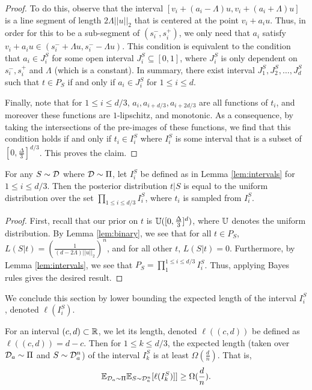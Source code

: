 \begin{proof}
To do this, observe that the interval $[v_i + (a_i - \Lambda)u, v_i + (a_i + \Lambda)u]$ is a line segment of length $2\Lambda||u||_2$ that is centered at the point $v_i + a_iu$. Thus, in order for this to be a sub-segment of $(s_i^-, s_i^+)$, we only need that $a_i$ satisfy $v_i + a_iu \in (s_i^- + \Lambda u, s_i^- - \Lambda u)$. This condition is equivalent to the condition that $a_i \in J_i^S$ for some open interval $J_i^S \subseteq [0, 1]$, where $J_i^S$ is only dependent on $s_i^-, s_i^+$ and $\Lambda$ (which is a constant). In summary, there exist interval $J_1^S, J_2^S, \dots, J_d^S$ such that $t \in P_S$ if and only if $a_i \in J_i^S$ for $1 \leq i \leq d$.

Finally, note that for $1 \leq i \leq d/3$, $a_i, a_{i+d/3}, a_{i + 2d/3}$ are all functions of $t_i$, and moreover these functions are $1$-lipschitz, and monotonic. As a consequence, by taking the intersections of the pre-images of these functions, we find that this condition holds if and only if $t_i \in I_i^S$ where $I_i^S$ is some interval that is a subset of $[0, \frac{\Delta}{3}]^{d/3}$. This proves the claim.
\end{proof}

\begin{cor}\label{cor:posterior}
For any $S \sim {\mathcal D}$ where ${\mathcal D} \sim \Pi$, let $I_i^S$ be defined as in Lemma \ref{lem:intervals} for $1 \leq i \leq d/3$. Then the posterior distribution $t|S$ is equal to the uniform distribution over the set $\prod_{1 \leq i \leq d/3} I_i^S$, where $t_i$ is sampled from $I_i^S$. 
\end{cor}

\begin{proof}
First, recall that our prior on $t$ is $\mathbb U([0, \frac{\Delta}{3}]^d)$, where $\mathbb U$ denotes the uniform distribution. By Lemma \ref{lem:binary}, we see that for all $t \in P_S$, $L(S|t) = \left(\frac{1}{(d - 2\Lambda)||u||_2}\right)^n$, and for all other $t$, $L(S|t) = 0$. Furthermore, by Lemma \ref{lem:intervals}, we see that $P_S = \prod_1^{1 \leq i \leq d/3} I_i^S$. Thus, applying Bayes rules gives the desired result. 
\end{proof}

We conclude this section by lower bounding the expected length of the interval $I_i^S$, denoted $\ell(I_i^S)$. 
\begin{lem}\label{lem:expected_length}
For an interval $(c, d) \subset \mathbb R$, we let its length, denoted $\ell((c,d))$ be defined as $\ell((c,d)) = d - c$. Then for $1 \leq k \leq d/3$, the expected length (taken over ${\mathcal D}_a \sim \Pi$ and $S \sim {\mathcal D}_a^n$) of the interval $I_k^S$ is at least $\Omega(\frac{d}{n})$. That is, $${\mathbb E}_{{\mathcal D}_a \sim \Pi}{\mathbb E}_{S \sim {\mathcal D}_a^n}[\ell(I_k^S)]] \geq \Omega(\frac{d}{n}).$$
\end{lem}

